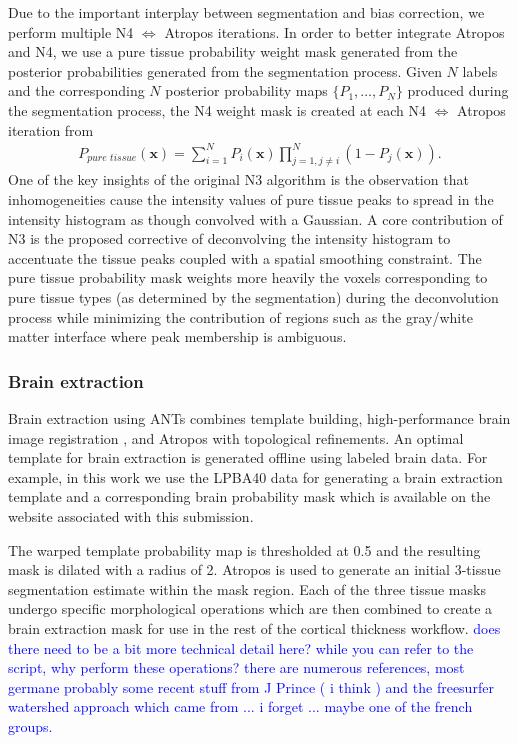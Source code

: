 Due to the important interplay between segmentation and bias correction,
we perform multiple N4 $\Leftrightarrow$ Atropos iterations.
In order to better integrate Atropos and N4, we use  
a pure tissue probability weight mask generated from the 
posterior probabilities generated from the segmentation 
process.  Given $N$ labels and the corresponding $N$
posterior probability maps $\{ P_1, \ldots, P_N\}$ produced
during the segmentation process, the N4 weight mask is 
created at each N4 $\Leftrightarrow$ Atropos iteration from
\begin{align}
  P_{pure\,\,tissue}(\mathbf{x}) = \sum_{i=1}^N P_i(\mathbf{x}) \prod_{j=1, j \neq i}^N \left( 1 - P_j(\mathbf{x}) \right).
\end{align}
One of the key insights of the original N3 algorithm is the
observation that inhomogeneities cause the intensity values of
pure tissue peaks to spread in the intensity histogram as though
convolved with a Gaussian.  A core contribution of N3 is the
proposed corrective of deconvolving the intensity histogram to 
accentuate the tissue peaks coupled with a spatial smoothing 
constraint. The pure tissue probability mask
weights more heavily the voxels corresponding to pure tissue 
types (as determined by the segmentation) during the deconvolution process 
while minimizing the contribution of regions such as the gray/white matter 
interface where peak membership is ambiguous. 

\subsubsection{Brain extraction}

Brain extraction using ANTs combines template building, high-performance
brain image registration \citep{avants2011}, and Atropos with topological refinements.  
An optimal template for brain extraction is 
generated offline using labeled brain data.  For example, in this work we use the LPBA40 data 
for generating a brain extraction template and a corresponding brain probability mask which is
available on the website associated with this submission. 

  The warped template probability map is thresholded at 0.5 and the resulting mask is dilated
with a radius of 2.  Atropos is used to generate an initial 3-tissue segmentation estimate within the mask
region.  Each of the three tissue masks undergo specific morphological operations which are then
combined to create a brain extraction mask for use in the rest of the
cortical thickness workflow.  \textcolor{blue}{does there need to be a
  bit more technical detail here?  while you can refer to the script,
  why perform these operations?  there are numerous references, most
  germane probably some recent stuff from J Prince ( i think ) and the
  freesurfer watershed approach which came from ... i forget ... maybe
  one of the french groups.}

